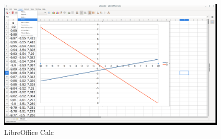 \begin{figure}[h!]		
	\centering
   	\includegraphics[width=8.0in]{pictures/picture_024.png}
  	\caption{LibreOffice Calc}
   	\label{fig:LibreOfficeCalc024}
\end{figure}